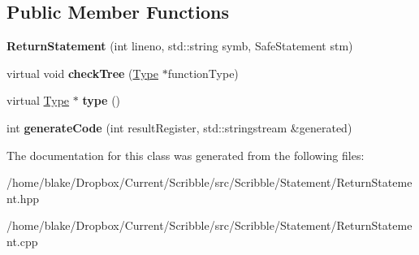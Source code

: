 \subsection*{Public Member Functions}
\begin{DoxyCompactItemize}
\item 
\hypertarget{class_scribble_core_1_1_return_statement_a2f22388b0074e0093634f470fdc168db}{{\bfseries Return\-Statement} (int lineno, std\-::string symb, Safe\-Statement stm)}\label{class_scribble_core_1_1_return_statement_a2f22388b0074e0093634f470fdc168db}

\item 
\hypertarget{class_scribble_core_1_1_return_statement_a4f93dfa382b64c53a404d9c381552670}{virtual void {\bfseries check\-Tree} (\hyperlink{class_scribble_core_1_1_type}{Type} $\ast$function\-Type)}\label{class_scribble_core_1_1_return_statement_a4f93dfa382b64c53a404d9c381552670}

\item 
\hypertarget{class_scribble_core_1_1_return_statement_a4d5daf10f1b3460311960d5c3f609da9}{virtual \hyperlink{class_scribble_core_1_1_type}{Type} $\ast$ {\bfseries type} ()}\label{class_scribble_core_1_1_return_statement_a4d5daf10f1b3460311960d5c3f609da9}

\item 
\hypertarget{class_scribble_core_1_1_return_statement_a11ad3cbcb2a819c5a67d997694b6dbe0}{int {\bfseries generate\-Code} (int result\-Register, std\-::stringstream \&generated)}\label{class_scribble_core_1_1_return_statement_a11ad3cbcb2a819c5a67d997694b6dbe0}

\end{DoxyCompactItemize}


The documentation for this class was generated from the following files\-:\begin{DoxyCompactItemize}
\item 
/home/blake/\-Dropbox/\-Current/\-Scribble/src/\-Scribble/\-Statement/Return\-Statement.\-hpp\item 
/home/blake/\-Dropbox/\-Current/\-Scribble/src/\-Scribble/\-Statement/Return\-Statement.\-cpp\end{DoxyCompactItemize}
